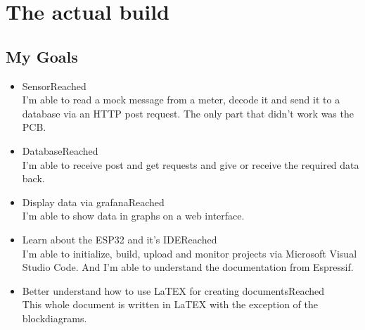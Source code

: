 \documentclass[a4paper,twoside, 12pt]{report}
\theoremstyle{break}
\begin{document}
\chapter{The actual build}
\section{My Goals}
\begin{itemize}
\item Sensor\tabto{12cm}Reached\\
I'm able to read a mock message from a meter, decode it and send it to a database via an HTTP post request. The only part that didn't work was the PCB.
\item Database\tabto{12cm}Reached\\
I'm able to receive post and get requests and give or receive the required data back.
\item Display data via grafana\tabto{12cm}Reached\\
I'm able to show data in graphs on a web interface.
\item Learn about the ESP32 and it's IDE\tabto{12cm}Reached\\
I'm able to initialize, build, upload and monitor projects via Microsoft Visual Studio Code. And I'm able to understand the documentation from Espressif.
\item Better understand how to use LaTEX for creating documents\tabto{12cm}Reached\\
This whole document is written in LaTEX with the exception of the blockdiagrams.
\end{itemize}
\vfill
\eject
\end{document}
